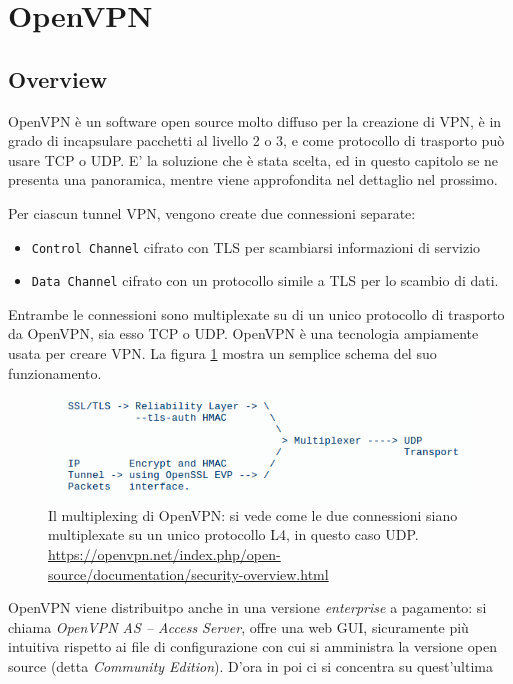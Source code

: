 \section{OpenVPN}
\subsection{Overview}
OpenVPN è un software open source molto diffuso per la creazione di VPN,
è in grado di incapsulare pacchetti al livello 2 o 3, e come protocollo di trasporto
può usare TCP o UDP. E' la soluzione che è stata scelta, ed in questo capitolo
se ne presenta una panoramica, mentre viene approfondita nel dettaglio
nel prossimo.


Per ciascun tunnel VPN, vengono create due connessioni separate:
\begin{itemize}
  \item \texttt{Control Channel} cifrato con TLS per scambiarsi informazioni di servizio
  \item \texttt{Data Channel} cifrato con un protocollo simile  a TLS per lo scambio
  di dati.
\end{itemize}
Entrambe le connessioni sono multiplexate su di un unico protocollo di trasporto
da OpenVPN, sia esso TCP o UDP\cite{openvpn-security}.
OpenVPN è una tecnologia ampiamente usata per creare VPN.
La figura \ref{fig:openvpn-sec} mostra un semplice schema del suo funzionamento.\\
\begin{figure}[h!]
  \includegraphics[scale=0.4]{img/openvpn_sec}
  \caption[Il multiplexing di OpenVPN]{Il multiplexing di OpenVPN: si vede come
  le due connessioni siano multiplexate su un unico protocollo L4, in questo caso UDP.
  \url{https://openvpn.net/index.php/open-source/documentation/security-overview.html}}
  \label{fig:openvpn-sec}
\end{figure}
OpenVPN viene distribuitpo anche in una versione \textit{enterprise} a pagamento: si chiama
\textit{OpenVPN AS -- Access Server}, offre una web GUI, sicuramente più intuitiva
rispetto ai file di configurazione con cui si amministra la versione open source
(detta \textit{Community Edition})\cite{openvpn-intro}. D'ora in poi ci si concentra su quest'ultima
